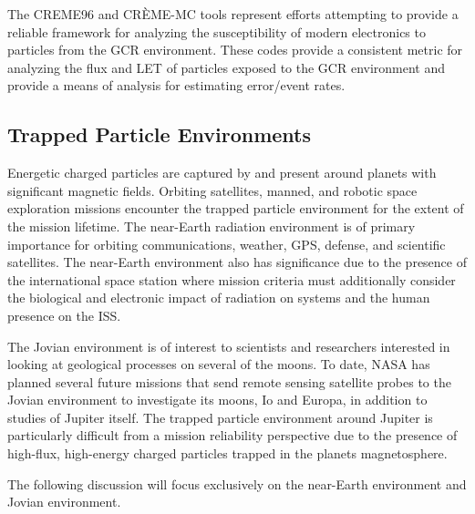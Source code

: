 The CREME96 and CR\`EME-MC tools represent efforts attempting to provide a reliable framework for analyzing the susceptibility of modern electronics to particles from the GCR environment.
These codes provide a consistent metric for analyzing the flux and LET of particles exposed to the GCR environment and provide a means of analysis for estimating error/event rates.

\subsection{Trapped Particle Environments} %
\label{sub:trapped_particle_environment}
Energetic charged particles are captured by and present around planets with significant magnetic fields.
Orbiting satellites, manned, and robotic space exploration missions encounter the trapped particle environment for the extent of the mission lifetime.
The near-Earth radiation environment is of primary importance for orbiting communications, weather, GPS, defense, and scientific satellites.
The near-Earth environment also has significance due to the presence of the international space station where mission criteria must additionally consider the biological and electronic impact of radiation on systems and the human presence on the ISS.

The Jovian environment is of interest to scientists and researchers interested in looking at geological processes on several of the moons.
To date, NASA has planned several future missions that send remote sensing satellite probes to the Jovian environment to investigate its moons, Io and Europa, in addition to studies of Jupiter itself.
The trapped particle environment around Jupiter is particularly difficult from a mission reliability perspective due to the presence of high-flux, high-energy charged particles trapped in the planets magnetosphere.

The following discussion will focus exclusively on the near-Earth environment and Jovian environment.

